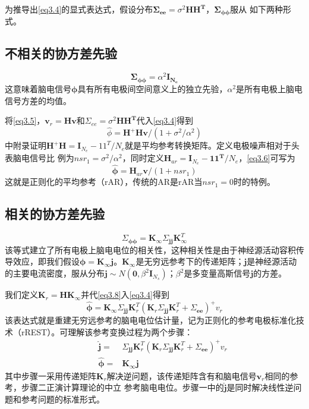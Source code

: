 为推导出\eqref{eq3.4}的显式表达式，假设分布$\mathbf{\Sigma_{ee}}=\sigma^{2}\mathbf{HH^T}$，$\mathbf{\Sigma_{\phi\phi}}$服从
如下两种形式。
\subsection{不相关的协方差先验}
\begin{equation}\label{eq3.5}
\mathbf{\Sigma_{\phi\phi}}=\alpha^{2}\mathbf{I_{N_{e}}}
\end{equation}
这意味着脑电信号$\mathbf{\phi}$具有所有电极间空间意义上的独立先验，$\alpha^2$是所有电极上脑电信号方差的均值。

将\eqref{eq3.5}，$\mathbf{v}_{r}=\mathbf{Hv}$和$\Sigma_{ee}=\sigma^{2}\mathbf{HH^{T}}$代入\eqref{eq3.4}得到
\begin{equation}\label{eq3.6}
\hat{\phi}=\mathbf{H^{+}Hv}/(1+\sigma^{2}/{\alpha^{2}})
\end{equation}
\cite{hu_unified_2018}中附录证明$\mathbf{H^+H}=\mathbf{I}_{N_e}-11^T/N_e$就是平均参考转换矩阵。定义电极噪声相对于头表脑电信号比
例为$nsr_1=\sigma^2/\alpha^2$，同时定义$\mathbf{H}_{ar}=\mathbf{I}_{N_e}-\mathbf{11^T}/{N_e}$，\eqref{eq3.6}可写为
\begin{equation}\label{eq3.7}
\hat{\mathbf{\phi}}=\mathbf{H}_{ar}\mathbf{v}/(1+nsr_1)
\end{equation}
这就是正则化的平均参考（rAR），传统的AR是rAR当$nsr_1=0$时的特例。
\subsection{相关的协方差先验}
\begin{equation}\label{eq3.8}
\Sigma_{\mathbf{\phi\phi}}=\mathbf{K}_{\infty}\Sigma_{\mathbf{jj}}\mathbf{K}_{\infty}^T
\end{equation}
该等式建立了所有电极上脑电电位的相关性，这种相关性是由于神经源活动容积传导效应，即我们假设$\mathbf{\phi}=\mathbf{K}_{\infty}\mathbf{j}$。$\mathbf{K}_\infty$是无穷远参考下的传递矩阵；$\mathbf{j}$是神经源活动的主要电流密度，服从分布$\mathbf{j}\sim{N(\mathbf{0},\beta^2\mathbf{I}_{N_s})}$；$\beta^{2}$是多变量高斯信号$\mathbf{j}$的方差。

我们定义$\mathbf{K}_{r}=\mathbf{HK}_{\infty}$并代\eqref{eq3.8}入\eqref{eq3.4}得到
\begin{equation}\label{eq3.9}
\hat{\mathbf{\phi}}=\mathbf{K}_\infty\Sigma_{\mathbf{jj}}\mathbf{K}_r^T(\mathbf{K}_r\Sigma_{\mathbf{jj}}\mathbf{K}_r^T+\Sigma_{\mathbf{ee}})^+v_r
\end{equation}
该表达式就是重建无穷远参考的脑电电位估计量，记为正则化的参考电极标准化技术（rREST）。可理解该参考变换过程为两个步骤：
\begin{align*}
\qquad\hat{\mathbf{j}}={} &\Sigma_{\mathbf{jj}}\mathbf{K}_{r}^T(\mathbf{K}_{r}\Sigma_{\mathbf{jj}}\mathbf{K}_r^T+\Sigma_{\mathbf{ee}})^+v_r\\
\qquad\hat{\mathbf{\phi}}={} &\mathbf{K}_{\infty}\mathbf{j}
\end{align*}
其中步骤一采用传递矩阵$\mathbf{K}_{r}$解决逆问题，该传递矩阵含有和脑电信号$\mathbf{v}_{r}$相同的参考，步骤二正演计算理论的中立
参考脑电电位。步骤一中的$\hat{\mathbf{j}}$是同时解决线性逆问题和参考问题的标准形式。

